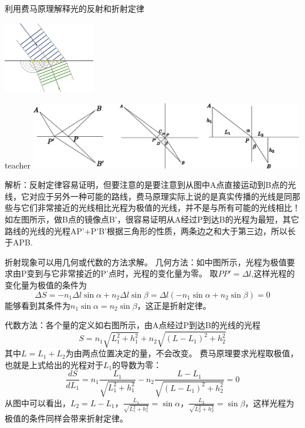\begin{example}
利用费马原理解释光的反射和折射定律
	\begin{flushright}
		\includegraphics[width = 0.3\textwidth]{images/opt-19.pdf} 
	\end{flushright}
\begin{taggedblock}{teacher}
\noindent
\includegraphics[width=0.9\textwidth]{images/fermat-solution.pdf}

\noindent
解析：反射定律容易证明，但要注意的是要注意到从图中A点直接运动到B点的光线，它对应于另外一种可能的路线，费马原理实际上说的是真实传播的光线是同那些与它们非常接近的光线相比光程为极值的光线，并不是与所有可能的光线相比！
如左图所示，做B点的镜像点B'，很容易证明从A经过P到达B的光程为最短，其它路线的光线的光程AP'+P'B'根据三角形的性质，两条边之和大于第三边，所以长于APB.


折射现象可以用几何或代数的方法求解。
几何方法：如中图所示，光程为极值要求由P变到与它非常接近的P'点时，光程的变化量为零。
取$PP'=\Delta l$,这样光程的变化量为极值的条件为
\[
\Delta S =-n_1\Delta l \sin\alpha + n_2\Delta l\sin\beta = \Delta l(-n_1\sin\alpha+n_2\sin\beta) = 0
\]
能够看到其条件为$n_1\sin\alpha=n_2\sin\beta$，这正是折射定律。

代数方法：各个量的定义如右图所示，由A点经过P到达B的光线的光程
\[S = n_1\sqrt{L_1^2+h_1^2}+n_2\sqrt{(L-L_1)^2+h_2^2}\]
其中$L = L_1+L_2$为由两点位置决定的量，不会改变。
费马原理要求光程取极值，也就是上式给出的光程对于$L_1$的导数为零：
\[\frac{dS}{dL_1} = n_1\frac{L_1}{\sqrt{L_1^2+h_1^2}}-n_2\frac{L-L_1}{\sqrt{(L-L_1)^2+h_2^2}}=0\]
从图中可以看出，$L_2 = L-L_1$，$\frac{L_1}{\sqrt{L_1^2+h_1^2}} = \sin\alpha$，$\frac{L_2}{\sqrt{L_2^2+h_2^2}}=\sin\beta$，这样光程为极值的条件同样会带来折射定律。

\end{taggedblock}
\end{example}

